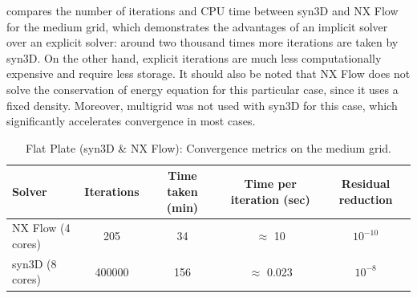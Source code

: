  compares the number of iterations and CPU time between syn3D and NX Flow for the medium grid, which demonstrates the advantages of an implicit solver over an explicit solver: around two thousand times more iterations are taken by syn3D. On the other hand, explicit iterations are much less computationally expensive and require less storage. It should also be noted that NX Flow does not solve the conservation of energy equation for this particular case, since it uses a fixed density. Moreover, multigrid was not used with syn3D for this case, which significantly accelerates convergence in most cases.
\begin{table}
\caption{Flat Plate (syn3D \& NX Flow): Convergence metrics on the medium grid.}
\label{tab:flatcpu}
\begin{tabular}{@{}l cccc@{}}
\toprule
Solver & Iterations & Time taken (min) & Time per iteration (sec) & Residual reduction \\
\midrule
NX Flow (4 cores) & 205 & 34 & $\approx$ 10 & $10^{-10}$ \\
syn3D (8 cores) & 400000 & 156 & $\approx$ 0.023 & $10^{-8}$
\\
\bottomrule
\end{tabular}
\end{table}

